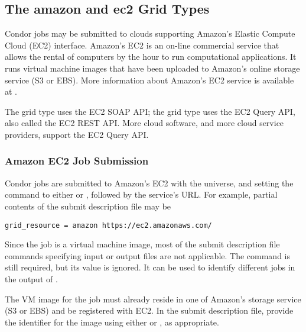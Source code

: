 \subsection{\label{sec:Amazon}The amazon and ec2 Grid Types }

Condor jobs may be submitted to clouds supporting
Amazon's Elastic Compute Cloud (EC2) interface.
Amazon's EC2 is an on-line commercial service that allows 
the rental of computers by the hour to run computational applications.
It runs virtual machine images that have been uploaded to Amazon's
online storage service (S3 or EBS).
More information about Amazon's EC2 service is available at
.

The  grid type uses the EC2 SOAP API;
the  grid type uses the EC2 Query API,
also called the EC2 REST API.
More cloud software, and more cloud service providers, support the 
EC2 Query API.

\subsubsection{\label{sec:Amazon-submit}Amazon EC2 Job Submission}

Condor jobs are submitted to Amazon's EC2
with the  universe, and setting the
 command to either
 or , followed by the service's URL.
For example,
partial contents of the submit description file may be
\begin{verbatim}
grid_resource = amazon https://ec2.amazonaws.com/
\end{verbatim}

Since the job is a virtual machine image,
most of the submit description file commands
specifying input or output files are not applicable.
The  command is still required,
but its value is ignored. 
It can be used to identify different jobs in the output of .

The VM image for the job must already reside in one of Amazon's storage
service (S3 or EBS) and be registered with EC2.
In the submit description file,
provide the identifier for the image using either
 or ,
as appropriate.


